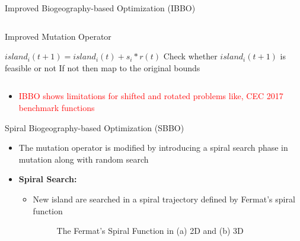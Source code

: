 \documentclass [9pt,times] {beamer}
\begin{document}
\begin{frame}[fragile]{Improved Biogeography-based Optimization (IBBO)}
\begin{columns}
\begin{column}{5cm}
\begin{block}{Improved Mutation Operator}
\begin{algorithm}[H]
\begin{algorithmic}[1]
        \STATE \textcolor[rgb]{0.00,0.00,1.00}{$island_i(t+1)=island_i(t)+ s_i*r(t)$}
    \STATE \textcolor[rgb]{0.00,0.00,1.00}{Check whether $island_i(t+1)$ is feasible or not}
\STATE \textcolor[rgb]{0.00,0.00,1.00}{If not then map to the original bounds}
\ENDIF

\ENDFOR	

\end{algorithmic}
\end{algorithm}
\end{block}
\end{column}
\end{columns}
\begin{itemize}
\item \scriptsize \textcolor{red}{IBBO shows limitations for  shifted and rotated problems like, CEC 2017 benchmark functions}


\end{itemize}

\end{frame}


\begin{frame}[fragile]{Spiral Biogeography-based Optimization (SBBO)}

\begin{itemize}
\item The mutation operator is modified by introducing a  \textcolor[rgb]{0.00,0.00,1.00}{spiral search phase} in mutation along with  \textcolor[rgb]{0.00,0.00,1.00}{random search}  \\[0.2cm]

\item {\bf Spiral Search:}
\begin{itemize}
\item New island are searched in a spiral trajectory defined by Fermat's spiral \cite{fermat2017} function
\begin{figure}
\centering


  \caption{The Fermat's Spiral Function in (a) 2D and (b) 3D }\label{fig:sp}
\end{figure}
\end{itemize}
\end{itemize}
\end{frame}
\end{document}
